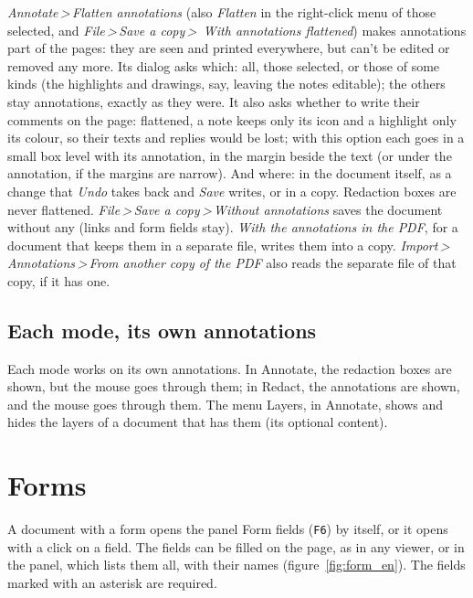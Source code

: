 \documentclass[12pt,
              article,
              oneside
              ]{memoir}
\newcommand*{\menu}[1]{\textit{#1}}
\newcommand*{\then}{\,>\,}
\newcommand*{\key}[1]{\texttt{#1}}
\begin{document}
%
%
\menu{Annotate\then Flatten annotations} (also \menu{Flatten} in the
right-click menu of those selected, and \menu{File\then Save a copy\then
With annotations flattened}) makes annotations part of the pages: they are
seen and printed everywhere, but can't be edited or removed any more. Its
dialog asks which: all, those selected, or those of some kinds (the
highlights and drawings, say, leaving the notes editable); the others stay
annotations, exactly as they were. It also asks whether to write their
comments on the page: flattened, a note keeps only its icon and a highlight
only its colour, so their texts and replies would be lost; with this
option each goes in a small box level with its annotation, in the margin
beside the text (or under the annotation, if the margins are narrow). And
where: in the document itself, as a change that \menu{Undo} takes back and
\menu{Save} writes, or in a copy. Redaction boxes are never flattened.
\menu{File\then Save a copy\then Without annotations} saves the document without
any (links and form fields stay). \menu{With the annotations in the PDF},
for a document that keeps them in a separate file, writes them into a
copy. \menu{Import\then Annotations\then From another copy of the PDF}
also reads the separate file of that copy, if it has one.

\subsection{Each mode, its own annotations}

%
Each mode works on its own annotations. In Annotate, the redaction boxes
are shown, but the mouse goes through them; in Redact, the annotations are
shown, and the mouse goes through them. The menu Layers, in Annotate, shows
and hides the layers of a document that has them (its optional content).

\section{Forms}
\label{sec:forms}

%
A document with a form opens the panel Form fields (\key{F6}) by itself, or it
opens with a click on a field. The fields can be filled on the page, as in
any viewer, or in the panel, which lists them all, with their names
(figure~\ref{fig:form_en}). The fields marked with an asterisk are
required.
\end{document}
